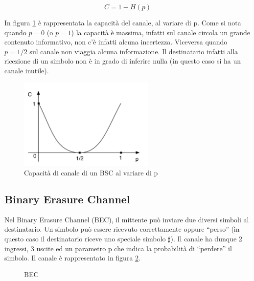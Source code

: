 \[
 C=1-H(p)
\]

In figura \ref{fig:cbsc} è rappresentata la capacità del canale, al variare di p.
Come si nota quando $p=0$ (o $p=1$) la capacità è massima, infatti sul canale circola un grande contenuto informativo, non c'è infatti 
alcuna incertezza. Viceversa quando $p=1/2$ sul canale non viaggia alcuna informazione. Il destinatario infatti alla ricezione di un simbolo non è in grado di inferire nulla (in questo caso si ha un canale inutile).

\begin{figure}[htbp]
\begin{center}
	\includegraphics[width=0.6\textwidth]{img/cbsc.pdf}
\caption{Capacità di canale di un BSC al variare di p}
\label{fig:cbsc}
\end{center}
\end{figure}

\newpage

\subsection{Binary Erasure Channel}
Nel Binary Erasure Channel (BEC), il mittente può inviare due diversi simboli al destinatario. Un simbolo può essere ricevuto 
correttamente oppure ``perso'' (in questo caso il destinatario riceve uno speciale simbolo $\sharp$). Il canale ha dunque 2 ingressi, 3 uscite 
ed un parametro p che indica la probabilità di ``perdere'' il simbolo. Il canale è rappresentato in figura \ref{fig:bec}.

\begin{figure}[htbp]
  \centering
  \hspace{1cm}
  \caption{BEC}
  \label{fig:bec}
\end{figure}

